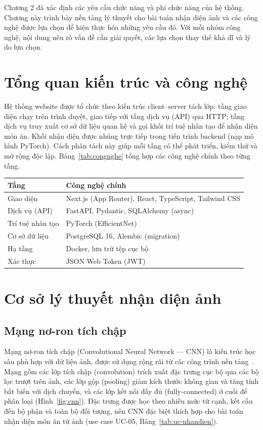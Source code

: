 \documentclass[../DoAn.tex]{subfiles}
\begin{document}
Chương 2 đã xác định các yêu cầu chức năng và phi chức năng của hệ thống. Chương này trình bày nền tảng lý thuyết cho bài toán nhận diện ảnh và các công nghệ được lựa chọn để hiện thực hóa những yêu cầu đó. Với mỗi nhóm công nghệ, nội dung nêu rõ vấn đề cần giải quyết, các lựa chọn thay thế khả dĩ và lý do lựa chọn.

\section{Tổng quan kiến trúc và công nghệ}
\label{sec:3-tongquan}
Hệ thống website được tổ chức theo kiến trúc client--server tách lớp: tầng giao diện chạy trên trình duyệt, giao tiếp với tầng dịch vụ (API) qua HTTP; tầng dịch vụ truy xuất cơ sở dữ liệu quan hệ và gọi khối trí tuệ nhân tạo để nhận diện món ăn. Khối nhận diện được nhúng trực tiếp trong tiến trình backend (nạp mô hình PyTorch). Cách phân tách này giúp mỗi tầng có thể phát triển, kiểm thử và mở rộng độc lập. Bảng~\ref{tab:congnghe} tổng hợp các công nghệ chính theo từng tầng.

\begin{center}
\label{tab:congnghe}
\begin{tabular}{|p{3.2cm}|p{10.3cm}|}\hline
\textbf{Tầng} & \textbf{Công nghệ chính} \\ \hline
Giao diện & Next.js (App Router), React, TypeScript, Tailwind CSS \\ \hline
Dịch vụ (API) & FastAPI, Pydantic, SQLAlchemy (async) \\ \hline
Trí tuệ nhân tạo & PyTorch (EfficientNet) \\ \hline
Cơ sở dữ liệu & PostgreSQL 16, Alembic (migration) \\ \hline
Hạ tầng & Docker, lưu trữ tệp cục bộ \\ \hline
Xác thực & JSON Web Token (JWT) \\ \hline
\end{tabular}
\end{center}

\section{Cơ sở lý thuyết nhận diện ảnh}
\label{sec:3-lythuyet}

\subsection{Mạng nơ-ron tích chập}
Mạng nơ-ron tích chập (Convolutional Neural Network --- CNN) là kiến trúc học sâu phù hợp với dữ liệu ảnh, được sử dụng rộng rãi từ các công trình nền tảng~\cite{lecun1998gradient, krizhevsky2012imagenet}. Mạng gồm các lớp tích chập (convolution) trích xuất đặc trưng cục bộ qua các bộ lọc trượt trên ảnh, các lớp gộp (pooling) giảm kích thước không gian và tăng tính bất biến với dịch chuyển, và các lớp kết nối đầy đủ (fully-connected) ở cuối để phân loại (Hình~\ref{fig:cnn}). Đặc trưng được học theo nhiều mức từ cạnh, kết cấu đến bộ phận và toàn bộ đối tượng, nên CNN đặc biệt thích hợp cho bài toán nhận diện món ăn từ ảnh (use case UC-05, Bảng~\ref{tab:uc-nhandien}).
\end{document}
